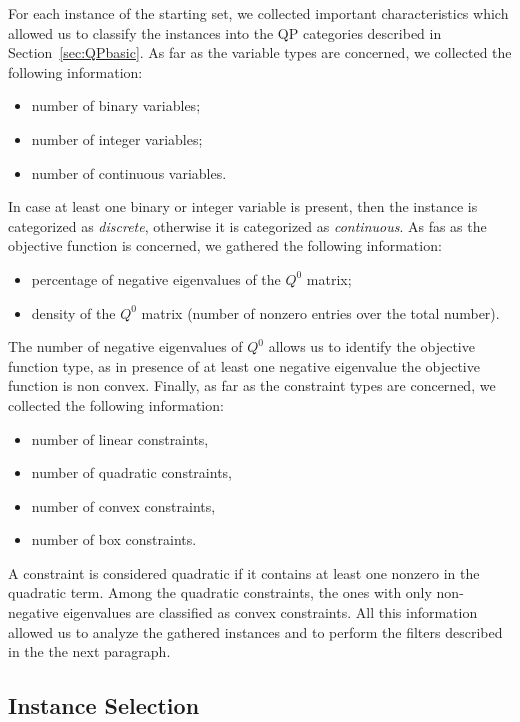 For each instance of the starting set, we collected important characteristics
which allowed us to classify the instances into the QP categories described in
Section~\ref{sec:QPbasic}. As far as the variable types are concerned, we
collected the following information:
%
\begin{itemize}
 \item number of binary variables; %
 \item number of integer variables; %
 \item number of continuous variables. %
\end{itemize}
%
In case at least one binary or integer variable is present, then the instance is
categorized as \emph{discrete}, otherwise it is categorized as \emph{continuous}.
As fas as the objective function is concerned, we gathered the following
information:
%
\begin{itemize}
 \item percentage of negative eigenvalues of the $Q^0$ matrix;
 \item density of the $Q^0$ matrix (number of nonzero entries over the total
       number). %
\end{itemize}
%
The number of negative eigenvalues of $Q^0$ allows us to identify the
objective function type, as in presence of at least one negative eigenvalue
the objective function is non convex. Finally, as far as the constraint types
are concerned, we collected the following information:
%
\begin{itemize}
 \item number of linear constraints, %
 \item number of quadratic constraints, %
 \item number of convex constraints, %
 \item number of box constraints. %
\end{itemize}
%
A constraint is considered quadratic if it contains at least one nonzero in
the quadratic term. Among the quadratic constraints, the ones with only
non-negative eigenvalues are classified as convex constraints. All this
information allowed us to analyze the gathered instances and to perform the
filters described in the the next paragraph.

\subsection{Instance Selection}\label{subsec:selection}

